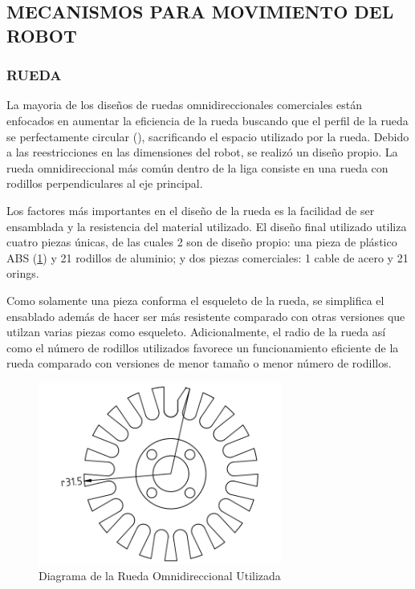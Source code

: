 \documentclass[twocolumn,10pt]{amrob}
\begin{document}
\subsection*{MECANISMOS PARA MOVIMIENTO DEL ROBOT}

\subsubsection*{RUEDA}
La mayoria de los diseños de ruedas omnidireccionales comerciales están enfocados en aumentar la eficiencia de la rueda buscando que el perfil de la rueda se perfectamente circular (\cite{rojas2005short}), sacrificando el espacio utilizado por la rueda. Debido a las reestricciones en las dimensiones del robot, se realizó un diseño propio. La rueda omnidireccional más común dentro de la liga consiste en una rueda con rodillos perpendiculares al eje principal. \par

Los factores más importantes en el diseño de la rueda es la facilidad de ser ensamblada y la resistencia del material utilizado. El diseño final utilizado utiliza cuatro piezas únicas, de las cuales 2 son de diseño propio: una pieza de plástico ABS (\ref{fig:ruedaOmni}) y 21 rodillos de aluminio; y dos piezas comerciales: 1 cable de acero y 21 orings. \par

Como solamente una pieza conforma el esqueleto de la rueda, se simplifica el ensablado además de hacer ser más resistente comparado con otras versiones que utilzan varias piezas como esqueleto. Adicionalmente, el radio de la rueda así como el número de rodillos utilizados favorece un funcionamiento eficiente de la rueda comparado con versiones de menor tamaño o menor número de rodillos.\par

\begin{figure}[t]
  \centering
    \includegraphics[width=8cm]{rueda.png}
  \caption{Diagrama de la Rueda Omnidireccional Utilizada}
  \label{fig:ruedaOmni}
\end{figure}
\end{document}
